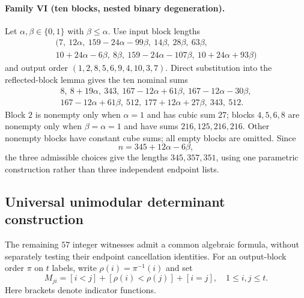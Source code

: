 \documentclass[10pt]{article}
\begin{document}
\paragraph{Family VI (ten blocks, nested binary degeneration).}
Let $\alpha,\beta\in\{0,1\}$ with $\beta\le\alpha$.
Use input block lengths
\[
\begin{gathered}
(7,\ 12\alpha,\ 159-24\alpha-99\beta,\
14\beta,\ 28\beta,\ 63\beta,\\
10+24\alpha-6\beta,\ 8\beta,\
159-24\alpha-107\beta,\
10+24\alpha+93\beta)
\end{gathered}
\]
and output order $(1,2,8,5,6,9,4,10,3,7)$.
Direct substitution into the reflected-block lemma
gives the ten nominal sums
\[
\begin{gathered}
8,\ 8+19\alpha,\ 343,\
167-12\alpha+61\beta,\
167-12\alpha-30\beta,\\
167-12\alpha+61\beta,\ 512,\
177+12\alpha+27\beta,\ 343,\ 512.
\end{gathered}
\]
Block $2$ is nonempty only when $\alpha=1$
and has cubic sum $27$; blocks $4,5,6,8$
are nonempty only when $\beta=\alpha=1$
and have sums $216,125,216,216$. Other
nonempty blocks have constant cube sums;
all empty blocks are omitted. Since
\[
n=345+12\alpha-6\beta,
\]
the three admissible choices give the
lengths $345,357,351$, using one
parametric construction rather than
three independent endpoint lists.

\subsection{Universal unimodular determinant construction}
\label{subsec:unimodular-factory}
The remaining $57$ integer witnesses admit a common
algebraic formula, without separately testing
their endpoint cancellation identities.
For an output-block order $\pi$ on $t$ labels,
write $\rho(i)=\pi^{-1}(i)$ and set
\[
M_{ji}=[i<j]+[\rho(i)<\rho(j)]+[i=j],
\quad 1\le i,j\le t.
\]
Here brackets denote indicator functions.
\end{document}
